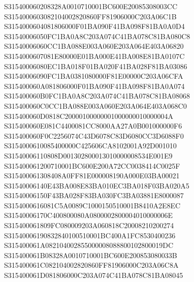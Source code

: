 \documentclass[12pt,a4paper]{article}
\begin{document}
\begin{framed}
{S315400060208328A0010710001BC600E20085308003CC\newline
S3154000603082104002820860FF81906000C203A06C1B\newline
S3154000604081806000F01BA090F41BA098F81BA0A0D4\newline
S31540006050FC1BA0A8C203A074C41BA078C81BA080C8\newline
S31540006060CC1BA088E003A060E203A064E403A06820\newline
S3154000607081E80000E01BA000E41BA008E81BA0107C\newline
S31540006080EC1BA018F01BA020F41BA028F81BA03086\newline
S31540006090FC1BA0381080000F81E00000C203A06CFA\newline
S315400060A081806000F01BA090F41BA098F81BA0A074\newline
S315400060B0FC1BA0A8C203A074C41BA078C81BA08068\newline
S315400060C0CC1BA088E003A060E203A064E403A068C0\newline
S315400060D0818C20000100000001000000010000004A\newline
S315400060E081C4400081CC8000AA27A0B001000000F6\newline
S315400060F0C2256074C43D6078C83D6080CC3D6088F0\newline
S3154000610085400000C425606CA8102001A92D001010\newline
S31540006110808D001302800013010000008534E001E9\newline
S315400061200710001BC600E200A72CC0038414C0025F\newline
S315400061308408A0FF81E000008190A000E03BA00021\newline
S31540006140E43BA008E83BA010EC3BA018F03BA020A5\newline
S31540006150F43BA028F83BA030FC3BA03881E8000087\newline
S3154000616081C5A0089C1000150510001B8410A2E8EC\newline
S31540006170C400800080A0800002800004010000006E\newline
S315400061809FC080009203A060818C20008210200274\newline
S31540006190832840100510001BC400A1FC8530400236\newline
S315400061A082104002855000008088800102800019DC\newline
S315400061B08328A0010710001BC600E200853080033B\newline
S315400061C082104002820860FF81906000C203A06C8A\newline
S315400061D081806000C203A074C41BA078C81BA08045\newline
}
\end{framed}
\end{document}
